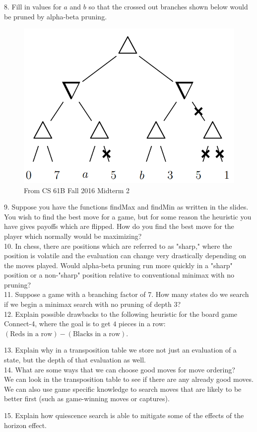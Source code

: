 \documentclass[12pt, letterpaper]{article}
\begin{document}
8. Fill in values for $a$ and $b$ so that the crossed out branches shown below would be pruned by alpha-beta pruning.
\begin{figure}[H]
    \centering
    \includegraphics[scale=0.3]{alpha-beta-prob.png}
    \caption*{From CS 61B Fall 2016 Midterm 2}
\end{figure}


9. Suppose you have the functions findMax and findMin as written in the slides. You wish to find the best move for a game, but for some reason the heuristic you have gives payoffs which are flipped. How do you find the best move for the player which normally would be maximizing? \\

10. In chess, there are positions which are referred to as "sharp," where the position is volatile and the evaluation can change very drastically depending on the moves played. Would alpha-beta pruning run more quickly in a "sharp" position or a non-"sharp" position relative to conventional minimax with no pruning? \\

11. Suppose a game with a branching factor of 7. How many states do we search if we begin a minimax search with no pruning of depth 3? \\

12. Explain possible drawbacks to the following heuristic for the board game Connect-4, where the goal is to get $4$ pieces in a row: $(\text{Reds in a row}) - (\text{Blacks in a row})$.

13. Explain why in a transposition table we store not just an evaluation of a state, but the depth of that evaluation as well. \\

14. What are some ways that we can choose good moves for move ordering? \\
We can look in the transposition table to see if there are any already good moves. We can also use game specific knowledge to search moves that are likely to be better first (such as game-winning moves or captures).

15. Explain how quiescence search is able to mitigate some of the effects of the horizon effect.\\
\end{document}
